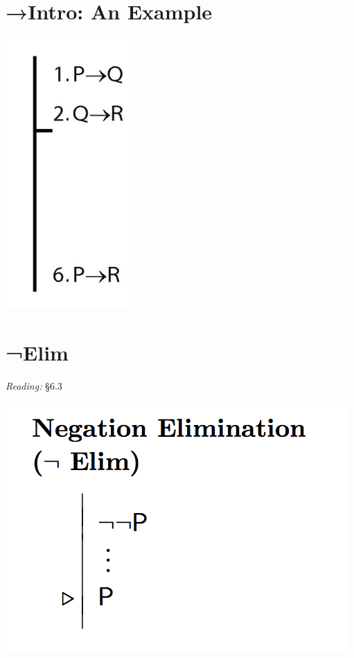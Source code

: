 \documentclass[12pt]{extarticle}
\begin{document}
\begin{multicols*}{3}
 
\section{→Intro: An Example}
 
\begin{center}
\includegraphics[scale=0.3]{img/proof_arrow_intro.png}
\end{center}
 
 
\section{¬Elim}
 
\emph{Reading:} §6.3
 
\begin{center}
\includegraphics[scale=0.3]{img/rule_negation_elim.png}
\end{center}
 

\end{multicols*}
\end{document}
